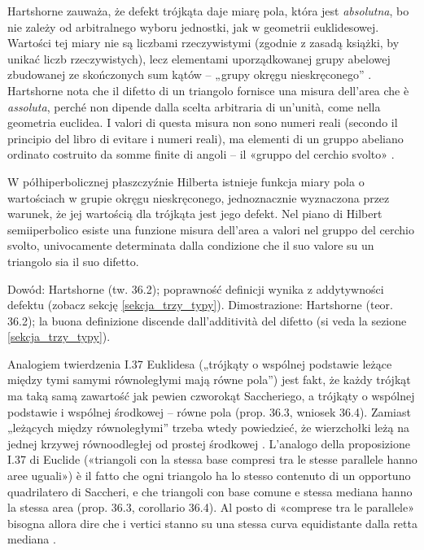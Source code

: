 Hartshorne \cite[s. 326]{hartshorne_2000} zauważa, że defekt trójkąta daje miarę pola, która jest \emph{absolutna}, bo nie zależy od arbitralnego wyboru jednostki, jak w geometrii euklidesowej. %
Wartości tej miary nie są liczbami rzeczywistymi (zgodnie z zasadą książki, by unikać liczb rzeczywistych), lecz elementami uporządkowanej grupy abelowej zbudowanej ze skończonych sum kątów -- „grupy okręgu nieskręconego'' \cite[s. 326--327]{hartshorne_2000}. %
Hartshorne \cite[p. 326]{hartshorne_2000} nota che il difetto di un triangolo fornisce una misura dell'area che è \emph{assoluta}, perché non dipende dalla scelta arbitraria di un'unità, come nella geometria euclidea. %
I valori di questa misura non sono numeri reali (secondo il principio del libro di evitare i numeri reali), ma elementi di un gruppo abeliano ordinato costruito da somme finite di angoli -- il «gruppo del cerchio svolto» \cite[p. 326--327]{hartshorne_2000}. %

\begin{theorem}
	W półhiperbolicznej płaszczyźnie Hilberta istnieje funkcja miary pola o wartościach w grupie okręgu nieskręconego, jednoznacznie wyznaczona przez warunek, że jej wartością dla trójkąta jest jego defekt. %
	Nel piano di Hilbert semiiperbolico esiste una funzione misura dell'area a valori nel gruppo del cerchio svolto, univocamente determinata dalla condizione che il suo valore su un triangolo sia il suo difetto. %
\end{theorem}

Dowód: Hartshorne \cite[s. 328]{hartshorne_2000} (tw. 36.2); poprawność definicji wynika z addytywności defektu (zobacz sekcję \ref{sekcja_trzy_typy}). %
Dimostrazione: Hartshorne \cite[p. 328]{hartshorne_2000} (teor. 36.2); la buona definizione discende dall'additività del difetto (si veda la sezione \ref{sekcja_trzy_typy}). %

Analogiem twierdzenia I.37 Euklidesa („trójkąty o wspólnej podstawie leżące między tymi samymi równoległymi mają równe pola'') jest fakt, że każdy trójkąt ma taką samą zawartość jak pewien czworokąt Saccheriego, a trójkąty o wspólnej podstawie i wspólnej środkowej -- równe pola \cite[s. 328--329]{hartshorne_2000} (prop. 36.3, wniosek 36.4). %
Zamiast „leżących między równoległymi'' trzeba wtedy powiedzieć, że wierzchołki leżą na jednej krzywej równoodległej od prostej środkowej \cite[s. 329]{hartshorne_2000}. %
L'analogo della proposizione I.37 di Euclide («triangoli con la stessa base compresi tra le stesse parallele hanno aree uguali») è il fatto che ogni triangolo ha lo stesso contenuto di un opportuno quadrilatero di Saccheri, e che triangoli con base comune e stessa mediana hanno la stessa area \cite[p. 328--329]{hartshorne_2000} (prop. 36.3, corollario 36.4). %
Al posto di «comprese tra le parallele» bisogna allora dire che i vertici stanno su una stessa curva equidistante dalla retta mediana \cite[p. 329]{hartshorne_2000}. %

